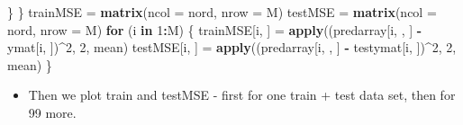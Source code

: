 \documentclass[]{article}
\newenvironment{Shaded}{\begin{snugshade}}{\end{snugshade}}
\newcommand{\KeywordTok}[1]{\textcolor[rgb]{0.13,0.29,0.53}{\textbf{#1}}}
\newcommand{\DataTypeTok}[1]{\textcolor[rgb]{0.13,0.29,0.53}{#1}}
\newcommand{\DecValTok}[1]{\textcolor[rgb]{0.00,0.00,0.81}{#1}}
\newcommand{\StringTok}[1]{\textcolor[rgb]{0.31,0.60,0.02}{#1}}
\newcommand{\ControlFlowTok}[1]{\textcolor[rgb]{0.13,0.29,0.53}{\textbf{#1}}}
\newcommand{\OperatorTok}[1]{\textcolor[rgb]{0.81,0.36,0.00}{\textbf{#1}}}
\newcommand{\NormalTok}[1]{#1}
\providecommand{\tightlist}{%
  \setlength{\itemsep}{0pt}\setlength{\parskip}{0pt}}
\begin{document}
\begin{Shaded}
\begin{Highlighting}[]
\NormalTok{    \}}
\NormalTok{\}}
\NormalTok{trainMSE =}\StringTok{ }\KeywordTok{matrix}\NormalTok{(}\DataTypeTok{ncol =}\NormalTok{ nord, }\DataTypeTok{nrow =}\NormalTok{ M)}
\NormalTok{testMSE =}\StringTok{ }\KeywordTok{matrix}\NormalTok{(}\DataTypeTok{ncol =}\NormalTok{ nord, }\DataTypeTok{nrow =}\NormalTok{ M)}
\ControlFlowTok{for}\NormalTok{ (i }\ControlFlowTok{in} \DecValTok{1}\OperatorTok{:}\NormalTok{M) \{}
\NormalTok{    trainMSE[i, ] =}\StringTok{ }\KeywordTok{apply}\NormalTok{((predarray[i, , ] }\OperatorTok{-}\StringTok{ }\NormalTok{ymat[i, ])}\OperatorTok{^}\DecValTok{2}\NormalTok{, }\DecValTok{2}\NormalTok{, mean)}
\NormalTok{    testMSE[i, ] =}\StringTok{ }\KeywordTok{apply}\NormalTok{((predarray[i, , ] }\OperatorTok{-}\StringTok{ }\NormalTok{testymat[i, ])}\OperatorTok{^}\DecValTok{2}\NormalTok{, }\DecValTok{2}\NormalTok{, mean)}
\NormalTok{\}}
\end{Highlighting}
\end{Shaded}

\begin{itemize}
\tightlist
\item
  Then we plot train and testMSE - first for one train + test data set,
  then for 99 more.
\end{itemize}
\end{document}
